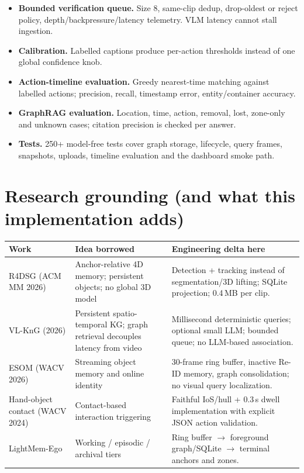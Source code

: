 \documentclass[10pt,a4paper]{article}
\begin{document}
\begin{itemize}[leftmargin=1.1em,itemsep=1pt,topsep=1pt]
  \item \textbf{Bounded verification queue.} Size 8, same-clip dedup, drop-oldest or reject
  policy, depth/backpressure/latency telemetry. VLM latency cannot stall ingestion.
  \item \textbf{Calibration.} Labelled captions produce per-action thresholds instead of one
  global confidence knob.
  \item \textbf{Action-timeline evaluation.} Greedy nearest-time matching against labelled
  actions; precision, recall, timestamp error, entity/container accuracy.
  \item \textbf{GraphRAG evaluation.} Location, time, action, removal, lost, zone-only and
  unknown cases; citation precision is checked per answer.
  \item \textbf{Tests.} 250+ model-free tests cover graph storage, lifecycle, query frames,
  snapshots, uploads, timeline evaluation and the dashboard smoke path.
\end{itemize}

\section{Research grounding (and what this implementation adds)}

\begin{center}
\small
\begin{tabularx}{\linewidth}{@{}lXX@{}}
\toprule
\textbf{Work} & \textbf{Idea borrowed} & \textbf{Engineering delta here} \\
\midrule
R4DSG (ACM MM 2026) & Anchor-relative 4D memory; persistent objects; no global 3D model &
Detection + tracking instead of segmentation/3D lifting; SQLite projection; 0.4\,MB per clip. \\
VL-KnG (2026) & Persistent spatio-temporal KG; graph retrieval decouples latency from video &
Millisecond deterministic queries; optional small LLM; bounded queue; no LLM-based association. \\
ESOM (WACV 2026) & Streaming object memory and online identity &
30-frame ring buffer, inactive Re-ID memory, graph consolidation; no visual query localization. \\
Hand-object contact (WACV 2024) & Contact-based interaction triggering &
Faithful IoS/hull + 0.3\,s dwell implementation with explicit JSON action validation. \\
LightMem-Ego & Working / episodic / archival tiers &
Ring buffer $\rightarrow$ foreground graph/SQLite $\rightarrow$ terminal anchors and zones. \\
\bottomrule
\end{tabularx}
\end{center}
\end{document}
